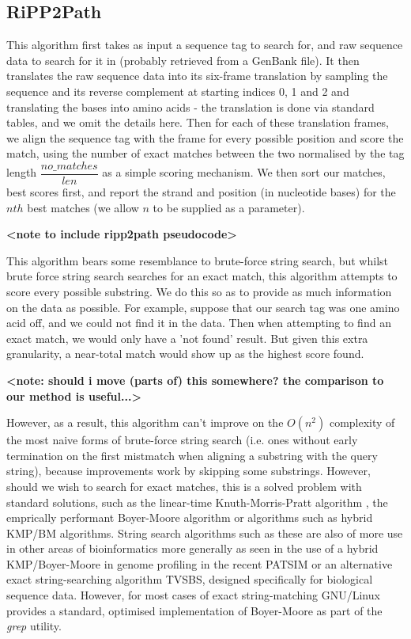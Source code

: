 \documentclass{l4proj}
\newcommand{\cit}[1]{\citep{#1}}
\begin{document}
\subsection{RiPP2Path}

This algorithm first takes as input a sequence tag to search for, and raw sequence data to search for it in (probably retrieved from a GenBank file). It then translates the raw sequence data into its six-frame translation by sampling the sequence and its reverse complement at starting indices 0, 1 and 2 and translating the bases into amino acids - the translation is done via standard tables, and we omit the details here. Then for each of these translation frames, we align the sequence tag with the frame for every possible position and score the match, using the number of exact matches between the two normalised by the tag length \(\dfrac{no\_matches}{len}\) as a simple scoring mechanism. We then sort our matches, best scores first, and report the strand and position (in nucleotide bases) for the \(nth\) best matches (we allow \(n\) to be supplied as a parameter). 

\textbf{<note to include ripp2path pseudocode>}

This algorithm bears some resemblance to brute-force string search, but whilst brute force string search searches for an exact match, this algorithm attempts to score every possible substring. We do this so as to provide as much information on the data as possible. For example, suppose that our search tag was one amino acid off, and we could not find it in the data. Then when attempting to find an exact match, we would only have a 'not found' result. But given this extra granularity, a near-total match would show up as the highest score found. 

\textbf{<note: should i move (parts of) this somewhere? the comparison to our method is useful...>}

However, as a result, this algorithm can't improve on the \(O(n^2)\) complexity of the most naive forms of brute-force string search (i.e. ones without early termination on the first mistmatch when aligning a substring with the query string), because improvements work by skipping some substrings. However, should we wish to search for exact matches, this is a solved problem with standard solutions, such as the linear-time Knuth-Morris-Pratt algorithm \cit{kmp}, the emprically performant Boyer-Moore algorithm \cit{boyer-moore} or algorithms such as hybrid KMP/BM algorithms. \cit{kmpbm} \cit{kmpbmtwo} String search algorithms such as these are also of more use in other areas of bioinformatics more generally as seen in the use of a hybrid KMP/Boyer-Moore in genome profiling in the recent PATSIM \cit{patsim} or an alternative exact string-searching algorithm TVSBS, \cit{tvsbs} designed specifically for biological sequence data. However, for most cases of exact string-matching GNU/Linux provides a standard, optimised implementation of Boyer-Moore as part of the \textit{grep} utility.
\end{document}
